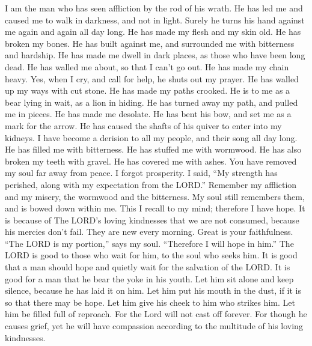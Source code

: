  I am the man who has seen affliction by the rod of his
wrath.  He has led me and caused me to walk in darkness, and
not in light.  Surely he turns his hand against me again and
again all day long.  He has made my flesh and my skin old.
He has broken my bones.  He has built against me, and
surrounded me with bitterness and hardship.  He has made me
dwell in dark places, as those who have been long dead.  He
has walled me about, so that I can't go out. He has made my chain heavy.
 Yes, when I cry, and call for help, he shuts out my prayer.
 He has walled up my ways with cut stone. He has made my
paths crooked.  He is to me as a bear lying in wait, as a
lion in hiding.  He has turned away my path, and pulled me
in pieces. He has made me desolate.  He has bent his bow,
and set me as a mark for the arrow.  He has caused the
shafts of his quiver to enter into my kidneys.  I have
become a derision to all my people, and their song all day long.
 He has filled me with bitterness. He has stuffed me with
wormwood.  He has also broken my teeth with gravel. He has
covered me with ashes.  You have removed my soul far away
from peace. I forgot prosperity.  I said, ``My strength has
perished, along with my expectation from the LORD.'' 
Remember my affliction and my misery, the wormwood and the bitterness.
 My soul still remembers them, and is bowed down within me.
 This I recall to my mind; therefore I have hope.
 It is because of The LORD's loving kindnesses that we are
not consumed, because his mercies don't fail.  They are new
every morning. Great is your faithfulness.  ``The LORD is
my portion,'' says my soul. ``Therefore I will hope in him.''
 The LORD is good to those who wait for him, to the soul
who seeks him.  It is good that a man should hope and
quietly wait for the salvation of the LORD.  It is good for
a man that he bear the yoke in his youth.  Let him sit
alone and keep silence, because he has laid it on him.  Let
him put his mouth in the dust, if it is so that there may be hope.
 Let him give his cheek to him who strikes him. Let him be
filled full of reproach.  For the Lord will not cast off
forever.  For though he causes grief, yet he will have
compassion according to the multitude of his loving kindnesses.
